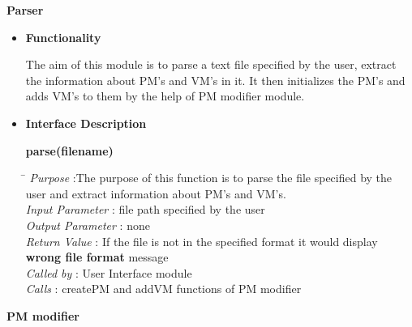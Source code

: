 \documentclass[a4paper,11pt]{article}
\begin{document}
\textbf{Parser}
\begin{itemize}
\item \textbf{Functionality}

The aim of this module is to parse a text file specified by the user, extract the information about PM's and VM's in it.
It then initializes the PM's and adds VM's to them by the help of PM modifier module.

\item \textbf{Interface Description} 

\textbf{parse(filename)}
  
\begin{tabbing}
\hspace*{4cm}\=  \kill
 \textit{Purpose} \> :The purpose of this function is to parse the file specified by the \\ \>user and extract information about PM's and VM's.\\
  \textit{Input Parameter} \> : file path specified by the user \\
  \textit{Output Parameter} \> : none \\
  \textit{Return Value} \> : If the file is not in the specified format it would display \\ \>\textbf{wrong file format} message \\
  \textit{Called by} \> : User Interface module \\
  \textit{Calls} \> : createPM and addVM functions of PM modifier
\end{tabbing}
\end{itemize}

\textbf{PM modifier}
\end{document}
